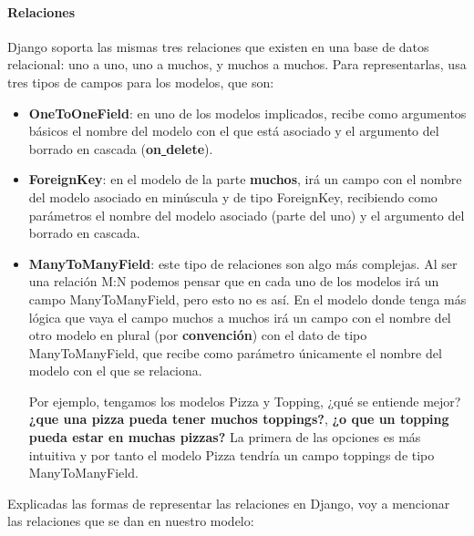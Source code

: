    \paragraph{Relaciones} \underline{}
    \newline Django soporta las mismas tres relaciones que existen en una base de datos relacional:
    uno a uno, uno a muchos, y muchos a muchos. Para representarlas, usa tres tipos de campos
    para los modelos, que son:

        \begin{itemize}
            \item \textbf{OneToOneField}: en uno de los modelos implicados, recibe como
            argumentos básicos el nombre del modelo con el que está asociado y el argumento
            del borrado en cascada (\textbf{on\underline{ }delete}).
            \item \textbf{ForeignKey}: en el modelo de la parte \textbf{muchos}, irá un campo
            con el nombre del modelo asociado en minúscula y de tipo ForeignKey, recibiendo
            como parámetros el nombre del modelo asociado (parte del uno) y el argumento del
            borrado en cascada.
            \item \textbf{ManyToManyField}: este tipo de relaciones son algo más complejas. Al
            ser una relación M:N podemos pensar que en cada uno de los modelos irá un campo
            ManyToManyField, pero esto no es así. En el modelo donde tenga más lógica que vaya
            el campo muchos a muchos irá un campo con el nombre del otro modelo en plural (por
            \textbf{convención}) con el dato de tipo ManyToManyField, que recibe como parámetro
            únicamente el nombre del modelo con el que se relaciona.

            Por ejemplo, tengamos los modelos Pizza y Topping, ¿qué se entiende mejor?
            \textbf{¿que una pizza pueda tener muchos toppings?}, \textbf{¿o que un
            topping pueda estar en muchas pizzas?} La primera de las opciones es más
            intuitiva y por tanto el modelo Pizza tendría un campo toppings de tipo
            ManyToManyField.
        \end{itemize}

    Explicadas las formas de representar las relaciones en Django, voy a mencionar las
    relaciones que se dan en nuestro modelo:

